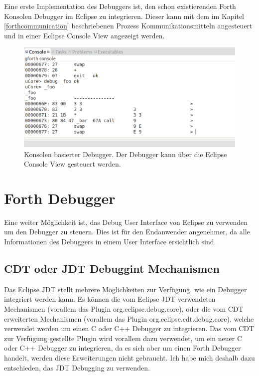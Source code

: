 Eine erste Implementation des Debuggers ist, den schon existierenden Forth Konsolen Debugger im Eclipse zu integrieren. Dieser kann mit dem im Kapitel \ref{forthcommunication} beschriebenen Prozess Kommunikationsmitteln angesteuert und in einer Eclipse Console View angezeigt werden.

\begin{figure}[H]
	\centering
		\includegraphics[scale=0.35]{debugger/consoledebugger.png}
		\caption{Konsolen basierter Debugger. Der Debugger kann über die Eclipse Console View gesteuert werden.}
		\label{fig:extensionpoint}
\end{figure}

\section{Forth Debugger}

Eine weiter Möglichkeit ist, das Debug User Interface von Eclipse zu verwenden um den Debugger zu steuern. Dies ist für den Endanwender angenehmer, da  alle Informationen des Debuggers in einem User Interface ersichtlich sind.

\subsection{CDT oder JDT Debuggint Mechanismen}

Das Eclipse JDT stellt  mehrere Möglichkeiten zur Verfügung, wie ein Debugger integriert werden kann. Es können die vom Eclipse JDT verwendeten Mechanismen (vorallem das Plugin org.eclipse.debug.core), oder die vom CDT erweiterten Mechanismen (vorallem das Plugin org.eclipse.cdt.debug.core), welche verwendet werden um einen C oder C++ Debugger zu integrieren. Das vom CDT zur Verfügung gestellte Plugin wird vorallem dazu verwendet, um ein neuer C oder C++ Debugger zu integrieren, da es sich aber um einen Forth Debugger handelt, werden diese Erweiterungen nicht gebraucht. Ich habe mich deshalb dazu entschieden, das JDT Debugging zu verwenden.

